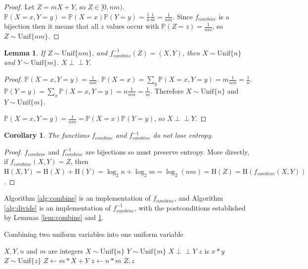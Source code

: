 \documentclass[12pt]{article}
\newtheorem{lemma}{Lemma}
\newtheorem{corollary}{Corollary}
\newcommand{\indep}{\perp\!\!\!\perp}
\newcommand{\unif}[1]{\mathrm{Unif}\{#1\}}
\newcommand{\entropy}[1]{\mathrm{H}(#1)}
\newcommand{\prob}[1]{\mathbb{P}(#1)}
\begin{document}
\begin{proof}
    Let $Z = mX+Y$, so $Z \in [0,nm)$. $\prob{X=x,Y=y} = \prob{X=x}\mathbb{P}(Y=y) = \frac{1}{n}\frac{1}{m} = \frac{1}{nm}$. Since $f_{combine}$ is a bijection then it means that all $z$ values occur with $\prob{Z=z} = \frac{1}{nm}$, so $Z \sim \unif{nm}$.
    
\end{proof}

\begin{lemma}
    If $Z \sim \unif{nm}$, and $f^{-1}_{combine}(Z) = (X,Y)$, then $X \sim \unif{n}$ and $Y \sim \unif{m}$. $X \indep Y$.
    \label{lem:divide-postconditions}
\end{lemma}

\begin{proof}
    $\prob{X=x,Y=y} = \frac{1}{nm}$. $\prob{X=x} = \sum_{y}\prob{X=x,Y=y} = m\frac{1}{nm} = \frac{1}{n}$. $\prob{Y=y} = \sum_{x}\prob{X=x,Y=y} = n\frac{1}{nm} = \frac{1}{m}$. Therefore $X\sim \unif{n}$ and $Y\sim \unif{m}$.

    $\mathbb{P}(X=x,Y=y) = \frac{1}{nm} = \mathbb{P}(X=x)\mathbb{P}(Y=y)$, so $X \indep Y$.
\end{proof}

\begin{corollary}
    The functions $f_{combine}$ and $f^{-1}_{combine}$ do not lose entropy.
    \label{cor:combine-entropy}
\end{corollary}

\begin{proof}$f_{combine}$ and $f^{-1}_{combine}$ are bijections so must preserve entropy. More directly, if $f_{combine}(X,Y) = Z$, then $\entropy{X,Y} = \entropy{X} + \entropy{Y} = \log_2{n} + \log_2{m} = \log_2(nm) = \entropy{Z} = \entropy{f_{combine}(X,Y)}$.
\end{proof}

Algorithm \ref{alg:combine} is an implementation of $f_{combine}$, and Algorithm \ref{alg:divide} is an implementation of $f^{-1}_{combine}$, with the postconditions established by Lemmas \ref{lem:combine} and \ref{lem:divide-postconditions}.

\begin{algorithm}
\caption{Combining two uniform variables into one uniform variable}
\label{alg:combine}
\begin{algorithmic}[1]
    \Require $X, Y, n$ and $m$ are integers
    \Require $X \sim \unif{n}$
    \Require $Y \sim \unif{m}$
    \Require $X \indep Y$
    \Ensure $z$ is $x * y$
    \Ensure $Z \sim \unif{z}$
  \State $Z \gets m * X + Y$
  \State $z \gets n * m$
  \State \Return $Z, z$
\EndProcedure
\end{algorithmic}
\end{algorithm}
\end{document}
